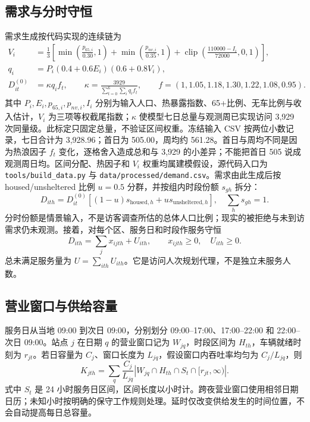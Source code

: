 \documentclass[12pt]{article}
\begin{document}
\subsection{需求与分时守恒}
需求生成按代码实现的连续链为
\begin{align}
 V_i &= \frac{1}{3}\left[\min\!\left(\frac{p_{65,i}}{0.30},1\right)+\min\!\left(\frac{p_{nv,i}}{0.35},1\right)+\operatorname{clip}\!\left(\frac{110000-I_i}{72000},0,1\right)\right],\\
 q_i &= P_i(0.4+0.6E_i)(0.6+0.8V_i),\\
 D_{it}^{(0)} &= \kappa q_i f_t,\qquad \kappa=\frac{3929}{\sum_{t=0}^{6}\sum_i q_i f_t},\qquad
 f=(1,1.05,1.18,1.30,1.22,1.08,0.95).
 \label{eq:demand-generation}
\end{align}
其中 $P_i,E_i,p_{65,i},p_{nv,i},I_i$ 分别为输入人口、热暴露指数、65+比例、无车比例与收入估计，$V_i$ 为三项等权截尾指数；$\kappa$ 使模型七日总量与观测周已实现访问 3,929 次同量级。此标定只固定总量，不验证区间权重。冻结输入 CSV 按两位小数记录，七日合计为 3,928.96；首日为 505.00，周均约 561.28。首日与周均不同是因为热浪因子 $f_t$ 变化，逐格舍入造成总和与 3,929 的小差异；不能把首日 505 说成观测周日均。区间分配、热因子和 $V_i$ 权重均属建模假设，源代码入口为 \texttt{tools/build\_data.py} 与 \texttt{data/processed/demand.csv}。需求由此生成后按 housed/unsheltered 比例 $u=0.5$ 分群，并按组内时段份额 $s_{gh}$ 拆分：
\begin{equation}
 D_{ith}=D_{it}^{(0)}\left[(1-u)s_{\mathrm{housed},h}+u s_{\mathrm{unsheltered},h}\right],\quad \sum_hs_{gh}=1.
 \label{eq:period-demand}
\end{equation}
分时份额是情景输入，不是访客调查所估的总体人口比例；现实的被拒绝与未到访需求仍未观测。接着，对每个区、服务日和时段作服务守恒
\begin{equation}
 D_{ith}=\sum_j x_{ijth}+U_{ith},\qquad x_{ijth}\geq0,\quad U_{ith}\geq0.
 \label{eq:conservation}
\end{equation}
总未满足服务量为 $U=\sum_{ith}U_{ith}$。它是访问人次规划代理，不是独立未服务人数。

\subsection{营业窗口与供给容量}
服务日从当地 09:00 到次日 09:00，分别划分 09:00--17:00、17:00--22:00 和 22:00--次日 09:00。站点 $j$ 在日期 $q$ 的营业窗口记为 $W_{jq}$，时段区间为 $H_{th}$，车辆就绪时刻为 $r_{jt}$。若日容量为 $C_j$、窗口长度为 $L_{jq}$，假设窗口内吞吐率均匀为 $C_j/L_{jq}$，则
\begin{equation}
 K_{jth}=\sum_q \frac{C_j}{L_{jq}}\left|W_{jq}\cap H_{th}\cap S_t\cap[r_{jt},\infty)\right|.
 \label{eq:capacity}
\end{equation}
式中 $S_t$ 是 24 小时服务日区间，区间长度以小时计。跨夜营业窗口使用相邻日期日历；未知小时按明确的保守工作规则处理。延时仅改变供给发生的时间位置，不会自动提高每日总容量。
\end{document}
